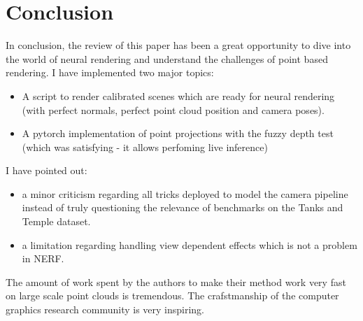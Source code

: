 \section{Conclusion}
\label{sec:conclusion}

In conclusion, the review of this paper has been a great opportunity to dive into the world of neural rendering and understand the challenges of point based rendering.
I have implemented two major topics: 
\begin{itemize}
    \item A script to render calibrated scenes which are ready for neural rendering (with perfect normals, perfect point cloud position and camera poses). 
    \item A pytorch implementation of point projections with the fuzzy depth test (which was satisfying - it allows perfoming live inference)
\end{itemize}
I have pointed out: 
\begin{itemize}
    \item a minor criticism regarding all tricks deployed to model the camera pipeline instead of truly questioning the relevance of benchmarks on the Tanks and Temple dataset. 
    \item a limitation regarding handling view dependent effects which is not a problem in NERF.
\end{itemize}

The amount of work spent by the authors to make their method work very fast on large scale point clouds is tremendous. The crafstmanship of the computer graphics research community is very inspiring.